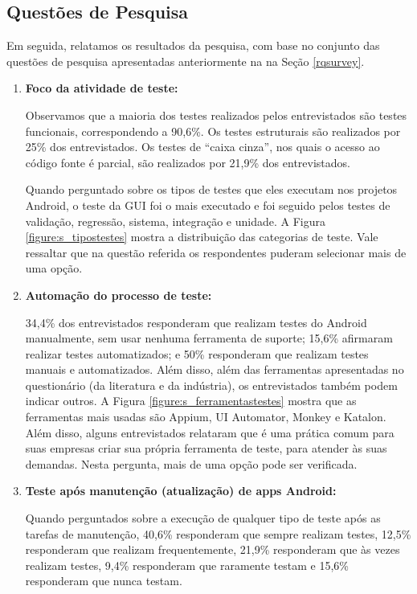\subsection{Questões de Pesquisa}

Em seguida, relatamos os resultados da pesquisa, com base no conjunto das questões de pesquisa apresentadas anteriormente na na Seção \ref{rqsurvey}.

\begin{enumerate}[label=\bf QP\arabic*]
    
\item \textbf{Foco da atividade de teste:}
    
Observamos que a maioria dos testes realizados pelos entrevistados são testes funcionais, correspondendo a 90,6\%. Os testes estruturais são realizados por 25\% dos entrevistados. Os testes de “caixa cinza”, nos quais o acesso ao código fonte é parcial, são realizados por 21,9\% dos entrevistados.

Quando perguntado sobre os tipos de testes que eles executam nos projetos Android, o teste da GUI foi o mais executado e foi seguido pelos testes de validação, regressão, sistema, integração e unidade. A Figura \ref{figure:s_tipostestes} mostra a distribuição das categorias de teste. Vale ressaltar que na questão referida os respondentes puderam selecionar mais de uma opção.
    
\item \textbf{Automação do processo de teste:}

34,4\% dos entrevistados responderam que realizam testes do Android manualmente, sem usar nenhuma ferramenta de suporte; 15,6\% afirmaram realizar testes automatizados; e 50\% responderam que realizam testes manuais e automatizados. Além disso, além das ferramentas apresentadas no questionário (da literatura e da indústria), os entrevistados também podem indicar outros. A Figura \ref{figure:s_ferramentastestes} mostra que as ferramentas mais usadas são Appium, UI Automator, Monkey e Katalon. Além disso, alguns entrevistados relataram que é uma prática comum para suas empresas criar sua própria ferramenta de teste, para atender às suas demandas. Nesta pergunta, mais de uma opção pode ser verificada.
    
\item \textbf{Teste após manutenção (atualização) de apps Android:}

Quando perguntados sobre a execução de qualquer tipo de teste após as tarefas de manutenção, 40,6\% responderam que sempre realizam testes, 12,5\% responderam que realizam frequentemente, 21,9\% responderam que às vezes realizam testes, 9,4\% responderam que raramente testam e 15,6\% responderam que nunca testam.


\end{enumerate}
